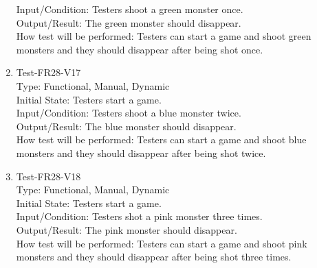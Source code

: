 \documentclass[12pt]{article}
\begin{document}
\begin{enumerate}[1.]
Input/Condition: Testers shoot a green monster once.\\
Output/Result: The green monster should disappear.\\
How test will be performed: Testers can start a game and
shoot green monsters and they should disappear after
being shot once.
\item Test-FR28-V17\\
Type: Functional, Manual, Dynamic\\
Initial State: Testers start a game.\\
Input/Condition: Testers shoot a blue monster twice.\\
Output/Result: The blue monster should disappear.\\
How test will be performed: Testers can start a game and
shoot blue monsters and they should disappear after
being shot twice.
\item Test-FR28-V18\\
Type: Functional, Manual, Dynamic\\
Initial State: Testers start a game.\\
Input/Condition: Testers shot a pink monster three times.\\
Output/Result: The pink monster should disappear.\\
How test will be performed: Testers can start a game and
shoot pink monsters and they should disappear after
being shot three times.
\end{enumerate}
\end{document}
